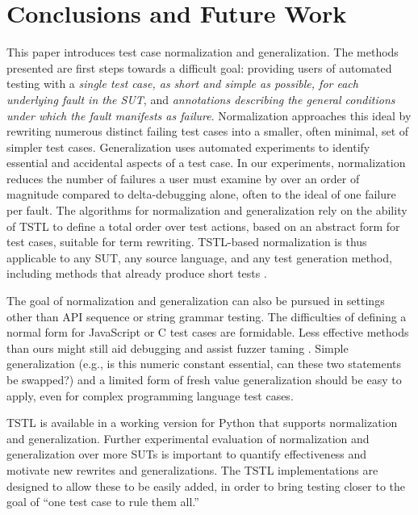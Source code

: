 \section{Conclusions and Future Work}

This paper introduces test case normalization and generalization.  The
methods presented are first steps towards a difficult goal: providing
users of automated testing with a \emph{single test case, as short and
  simple as possible, for each underlying fault in the SUT}, and
\emph{annotations describing the general conditions under which the
  fault manifests as failure}.  Normalization approaches this ideal by
rewriting numerous distinct failing test cases into a smaller, often
minimal, set of simpler test cases.  Generalization uses
automated experiments to identify essential and accidental aspects of
a test case.   In our experiments, normalization reduces the
number of failures a user must examine by over an order of magnitude
compared to delta-debugging alone, often  to the ideal of one failure per fault.  The algorithms for normalization and generalization rely
on the ability of TSTL \cite{NFM15,ISSTA15} to define a total order
over test actions, based on an abstract form for test cases, suitable
for term rewriting.  TSTL-based normalization is thus applicable to
any SUT, any source language, and any test generation method,
including methods that already produce short tests
\cite{FA11,SoftBET}. 


 The goal of normalization and generalization can also be pursued in
settings other than API sequence or string grammar testing.  The
difficulties of defining a normal form for JavaScript \cite{jsfunfuzz}
or C \cite{CReduce} test cases are formidable. Less effective methods
than ours might still aid debugging and assist fuzzer taming
\cite{PLDI13}.  Simple generalization (e.g., is this numeric constant
essential, can these two statements be swapped?) and a limited form of
fresh value generalization should be easy to apply, even for complex
programming language test cases.  

TSTL is available in a working version for Python \cite{tstl} that
supports normalization and generalization.  Further experimental
evaluation of normalization and generalization over more SUTs is
important to quantify effectiveness and motivate new rewrites and
generalizations.  The TSTL implementations are designed to allow these
to be easily added, in order to bring testing closer to the
goal of ``one test case to rule them all.''
